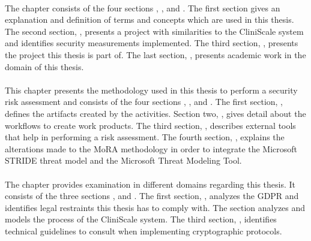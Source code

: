 \paragraph{} The chapter \textit{} consists of the four sections \textit{}, \textit{}, \textit{} and \textit{}. The first section \textit{} gives an explanation and definition of terms and concepts which are used in this thesis. The second section, \textit{}, presents a project with similarities to the CliniScale system and identifies security measurements implemented. The third section, \textit{}, presents the project this thesis is part of. The last section, \textit{}, presents academic work in the domain of this thesis.

\paragraph{} This chapter presents the methodology used in this thesis to perform a security risk assessment and consists of the four sections \textit{}, \textit{}, \textit{} and \textit{}. The first section, \textit{}, defines the artifacts created by the activities. Section two, \textit{}, gives detail about the workflows to create work products. The third section, \textit{}, describes external tools that help in performing a risk assessment. The fourth section, \textit{}, explains the alterations made to the MoRA methodology in order to integrate the Microsoft STRIDE threat model and the Microsoft Threat Modeling Tool.

\paragraph{} The chapter \textit{} provides examination in different domains regarding this thesis. It consists of the three sections \textit{}, \textit{} and \textit{}. The first section, \textit{}, analyzes the GDPR and identifies legal restraints this thesis has to comply with. The section \textit{} analyzes and models the process of the CliniScale system. The third section, \textit{}, identifies technical guidelines to consult when implementing cryptographic protocols.



